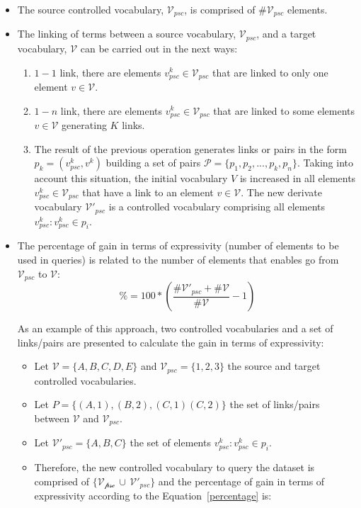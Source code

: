 \begin{itemize}
 \item The source controlled vocabulary, $\mathcal{V}_{psc}$, is comprised of \#$\mathcal{V}_{psc}$ elements.
 \item The linking of terms between a source vocabulary, $\mathcal{V}_{psc}$, and  a target vocabulary, $\mathcal{V}$ can be carried out in the next ways:
 \begin{enumerate}
  \item $1-1$ link, there are elements $v^k_{psc} \in \mathcal{V}_{psc}$ that are linked to only one element $v \in \mathcal{V}$.
  \item $1-n$ link, there are elements $v^k_{psc} \in \mathcal{V}_{psc}$ that are linked to some elements $v \in \mathcal{V}$ generating $K$ links.  
  \item The result of the previous operation generates links or pairs in the form $p_k=(v^k_{psc}, v^k)$ building a set of pairs $\mathcal{P}=\{p_1,p_2,...,p_k,p_n\}$. Taking into account this situation, 
  the initial vocabulary $V$ is increased in all elements $v^k_{psc} \in \mathcal{V}_{psc}$ that have a link to an element $v \in \mathcal{V}$. The new 
  derivate vocabulary $\mathcal{V'}_{psc}$ is a controlled vocabulary comprising all elements $v^k_{psc}: v^k_{psc} \in p_i$.
 \end{enumerate}
 
 \item The percentage of gain in terms of expressivity (number of elements to be used in queries) is related to the number of elements that enables go from $\mathcal{V}_{psc}$ to $\mathcal{V}$:	
 \begin{equation}\label{percentage}
  \%=100*(\frac{\#\mathcal{V'}_{psc} + \#\mathcal{V}}{\#\mathcal{V}}-1)
 \end{equation}
 
  As an example of this approach, two controlled vocabularies and a set of links/pairs are presented to calculate the gain in terms of expressivity:
  \begin{itemize}
  \item Let $\mathcal{V} = \{A, B, C, D, E\}$  and  $\mathcal{V}_{psc} = \{1, 2, 3\}$ the source and target controlled vocabularies.
  \item Let $P = \{ (A,1), (B,2), (C,1) (C,2) \}$ the set of links/pairs between $\mathcal{V}$ and $\mathcal{V}_{psc}$.
  \item Let $\mathcal{V'}_{psc} = \{ A, B, C \}$ the set of elements $v^k_{psc}: v^k_{psc} \in p_i$.
  \item Therefore, the new controlled vocabulary to query the dataset is comprised of $\{\mathcal{V_{psc}}\,\cup\,\mathcal{V'}_{psc}\}$ and the percentage of gain in terms of expressivity 
  according to the Equation~\ref{percentage} is:


\end{itemize}
\end{itemize}
